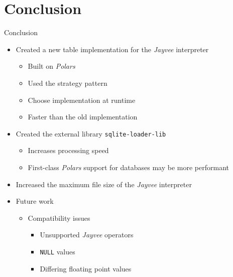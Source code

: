 \section{Conclusion}
\begin{frame}[t]{Conclusion}
	\begin{itemize}[<+(1)->]
		\item Created a new table implementation for the \emph{Jayvee} interpreter
		      \begin{itemize}
			      \item Built on \emph{Polars}
			      \item Used the strategy pattern
			      \item Choose implementation at runtime
			      \item Faster than the old implementation
		      \end{itemize}
		\item Created the external library \Verb|sqlite-loader-lib|
		      \begin{itemize}
			      \item Increases processing speed
			      \item First-class \emph{Polars} support for databases may be more performant
		      \end{itemize}
		\item Increased the maximum file size of the \emph{Jayvee} interpreter
		\item Future work
		      \begin{itemize}
			      \item Compatibility issues
			            \begin{itemize}
				            \item Unsupported \emph{Jayvee} operators
				            \item \Verb|NULL| values
				            \item Differing floating point values
			            \end{itemize}
		      \end{itemize}
	\end{itemize}
\end{frame}
